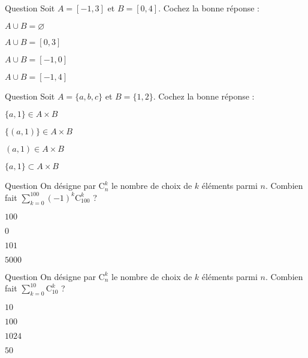 \begin{multi}[multiple,feedback=
{L'ensemble \(A\cup B\) est formé des éléments qui sont dans \(A\) ou dans \(B\).
}]{Question}
Soit \(A=[-1,3]\) et \(B=[0,4]\). Cochez la bonne réponse :

    \item \(A\cup B=\varnothing\)
    \item \(A\cup B=[0,3]\)
    \item \(A\cup B=[-1,0]\)
    \item* \(A\cup B=[-1,4]\)
\end{multi}


\begin{multi}[multiple,feedback=
{Les éléments de l'ensemble \(A\times B\) sont les couples dont la première composante est dans \(A\) et la seconde est dans \(B\).
}]{Question}
Soit \(A=\{a,b,c\}\) et \(B=\{1,2\}\). Cochez la bonne réponse :

    \item \(\{a,1\}\in A\times B\)
    \item \(\{(a,1)\}\in A\times B\)
    \item* \((a,1)\in A\times B\)
    \item \(\{a,1\}\subset A\times B\)
\end{multi}


\begin{multi}[multiple,feedback=
{Le binôme de Newton donne \(\displaystyle 0=(1-1)^{100}=\sum _{k=0}^{100}(-1)^k\mathrm{C}^k_{100}\).
}]{Question}
On désigne par \(\mathrm{C}^k_n\) le nombre de choix de \(k\) éléments parmi \(n\). Combien fait \(\displaystyle \sum _{k=0}^{100}(-1)^k\mathrm{C}^k_{100}\) ?

    \item \(100\)
    \item* \(0\)
    \item \(101\)
    \item \(5000\)
\end{multi}


\begin{multi}[multiple,feedback=
{Le binôme de Newton donne \(\displaystyle \sum _{k=0}^{10}\mathrm{C}^k_{10}=(1+1)^{10}=2^{10}=1024\).
}]{Question}
On désigne par \(\mathrm{C}^k_n\) le nombre de choix de \(k\) éléments parmi \(n\). Combien fait \(\displaystyle \sum _{k=0}^{10}\mathrm{C}^k_{10}\) ?

    \item \(10\)
    \item \(100\)
    \item* \(1024\)
    \item \(50\)
\end{multi}


